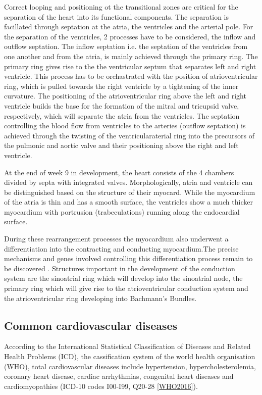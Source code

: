 Correct looping and positioning ot the transitional zones are critical for the separation of the heart into its functional components. The separation is facillated through septation at the atria, the ventricles and the arterial pole. For the separation of the ventricles, \num{2} processes have to be considered, the inflow and outflow septation. The inflow septation i.e. the septation of the ventricles from one another and from the atria, is mainly achieved through the primary ring. The primary ring gives rise to the the ventricular septum that separates left and right ventricle. This process has to be orchastrated with the position of atrioventricular ring, which is pulled towards the right ventricle by a tightening of the inner curvature. The positioning of the atrioventricular ring above the left and right ventricle builds the base for the formation of the mitral and tricupsid valve, respectively, which will separate the atria from the ventricles.  The septation controlling the blood flow from ventricles to the arteries (outflow septation) is achieved through the twisting of the ventricularaterial ring into the precursors of the pulmonic and aortic valve and their positioning above the right and left ventricle.  

At the end of week \num{9} in development, the heart consists of the \num{4} chambers divided by septa with integrated valves. Morphologically, atria and ventricle can be distinguished based on the structure of their myocard. While the myocardium of the atria is thin and has a smooth surface, the ventricles show a much thicker myocardium with portrusion (trabeculations) running along the endocardial surface. 

During these rearrangement processes the myocardium also underwent a differentiation into the contracting and conducting myocardium.The precise mechanisms and genes involved controlling this differentiation process remain to be discovered \citep{}. Structures important in the development of the conduction system are the sinoatrial ring which will develop into the sinoatrial node, the primary ring which will give rise to the atrioventricular conduction system and the atrioventricular ring developing into Bachmann's Bundles. 

\subsection{Common cardiovascular diseases}
\label{subsection:CVD}
According to the International Statistical Classification of Diseases and Related Health Problems (ICD), the cassification system of the world health organisation (WHO), total cardiovascular diseases include hypertension, hypercholesterolemia, coronary heart disease, cardiac arrhythmias, congenital heart diseases and cardiomyopathies (ICD-10 codes I00-I99, Q20-28 \cref{WHO2016}). 


